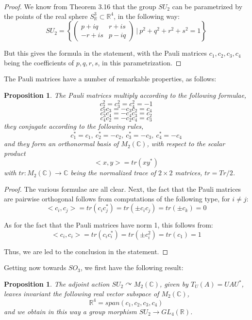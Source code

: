 \documentclass[12pt]{amsbook}
\newtheorem{proposition}[theorem]{Proposition}
\begin{document}
\begin{proof}
We know from Theorem 3.16 that the group $SU_2$ can be parametrized by the points of the real sphere $S^3_\mathbb R\subset\mathbb R^4$, in the following way:
$$SU_2=\left\{\begin{pmatrix}p+iq&r+is\\ -r+is&p-iq\end{pmatrix}\ \Big|\ p^2+q^2+r^2+s^2=1\right\}$$

But this gives the formula in the statement, with the Pauli matrices $c_1,c_2,c_3,c_4$ being the coefficients of $p,q,r,s$, in this parametrization.
\end{proof}

The Pauli matrices have a number of remarkable properties, as follows:

\begin{proposition}
The Pauli matrices multiply according to the following formulae,
$$c_2^2=c_3^2=c_4^2=-1$$
$$c_2c_3=-c_3c_2=c_4$$
$$c_3c_4=-c_4c_3=c_2$$
$$c_4c_2=-c_2c_4=c_3$$
they conjugate according to the following rules,
$$c_1^*=c_1,\ c_2^*=-c_2,\ c_3^*=-c_3,\ c_4^*=-c_4$$
and they form an orthonormal basis of $M_2(\mathbb C)$, with respect to the scalar product
$$<x,y>=tr(xy^*)$$
with $tr:M_2(\mathbb C)\to\mathbb C$ being the normalized trace of $2\times 2$ matrices, $tr=Tr/2$.
\end{proposition}

\begin{proof}
The various formulae are all clear. Next, the fact that the Pauli matrices are pairwise orthogonal follows from computations of the following type, for $i\neq j$:
$$<c_i,c_j>
=tr(c_ic_j^*)
=tr(\pm c_ic_j)
=tr(\pm c_k)
=0$$

As for the fact that the Pauli matrices have norm 1, this follows from:
$$<c_i,c_i>
=tr(c_ic_i^*)
=tr(\pm c_i^2)
=tr(c_1)
=1$$

Thus, we are led to the conclusion in the statement.
\end{proof}

Getting now towards $SO_3$, we first have the following result:

\begin{proposition}
The adjoint action $SU_2\curvearrowright M_2(\mathbb C)$, given by $T_U(A)=UAU^*$, leaves invariant the following real vector subspace of $M_2(\mathbb C)$,
$$\mathbb R^4=span(c_1,c_2,c_3,c_4)$$
and we obtain in this way a group morphism $SU_2\to GL_4(\mathbb R)$.
\end{proposition}
\end{document}
